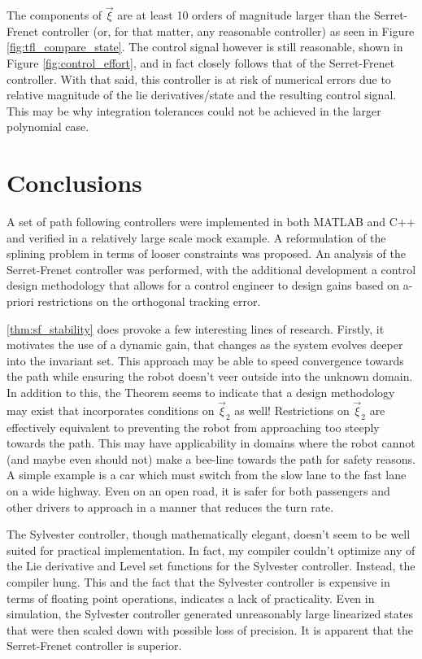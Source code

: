 The components of $\vec{\xi}$ are at least 10 orders of magnitude larger than the Serret-Frenet controller (or, for that matter, any reasonable controller) as seen in Figure \ref{fig:tfl_compare_state}. The control signal however is still reasonable, shown in Figure \ref{fig:control_effort}, and in fact closely follows that of the Serret-Frenet controller. With that said, this controller is at risk of numerical errors due to relative magnitude of the lie derivatives/state and the resulting control signal. This may be why integration tolerances could not be achieved in the larger polynomial case.

\section{Conclusions}
A set of path following controllers were implemented in both MATLAB and C++ and verified in a relatively large scale mock example. A reformulation of the splining problem in terms of looser constraints was proposed. An analysis of the Serret-Frenet controller was performed, with the additional development a control design methodology that allows for a control engineer to design gains based on a-priori restrictions on the orthogonal tracking error.

\eqref{thm:sf_stability} does provoke a few interesting lines of research. Firstly, it motivates the use of a dynamic gain, that changes as the system evolves deeper into the invariant set. This approach may be able to speed convergence towards the path while ensuring the robot doesn't veer outside into the unknown domain. In addition to this, the Theorem seems to indicate that a design methodology may exist that incorporates conditions on $\vec{\xi}_2$ as well! Restrictions on $\vec{\xi}_2$ are effectively equivalent to preventing the robot from approaching too steeply towards the path. This may have applicability in domains where the robot cannot (and maybe even should not) make a bee-line towards the path for safety reasons. A simple example is a car which must switch from the slow lane to the fast lane on a wide highway. Even on an open road, it is safer for both passengers and other drivers to approach in a manner that reduces the turn rate.

The Sylvester controller, though mathematically elegant, doesn't seem to be well suited for practical implementation. In fact, my compiler couldn't optimize any of the Lie derivative and Level set functions for the Sylvester controller. Instead, the compiler hung. This and the fact that the Sylvester controller is expensive in terms of floating point operations, indicates a lack of practicality. Even in simulation, the Sylvester controller generated unreasonably large linearized states that were then scaled down with possible loss of precision. It is apparent that the Serret-Frenet controller is superior.

\backmatter
\cleardoublepage
{}
{}
\printbibliography[title=References]

\cleardoublepage
{}
{}
\printindex


